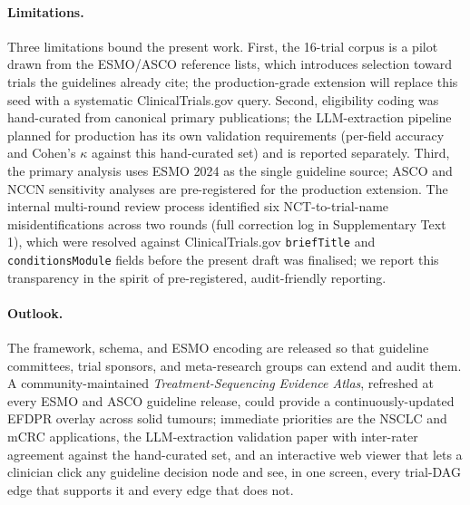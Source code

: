 \paragraph{Limitations.}
Three limitations bound the present work. First, the 16-trial corpus is a pilot drawn from the ESMO/ASCO reference lists, which introduces selection toward trials the guidelines already cite; the production-grade extension will replace this seed with a systematic ClinicalTrials.gov query. Second, eligibility coding was hand-curated from canonical primary publications; the LLM-extraction pipeline planned for production has its own validation requirements (per-field accuracy and Cohen's $\kappa$ against this hand-curated set) and is reported separately. Third, the primary analysis uses ESMO 2024 as the single guideline source; ASCO and NCCN sensitivity analyses are pre-registered for the production extension. The internal multi-round review process identified six NCT-to-trial-name misidentifications across two rounds (full correction log in Supplementary Text 1), which were resolved against ClinicalTrials.gov \texttt{briefTitle} and \texttt{conditionsModule} fields before the present draft was finalised; we report this transparency in the spirit of pre-registered, audit-friendly reporting.

\paragraph{Outlook.}
The framework, schema, and ESMO encoding are released so that guideline committees, trial sponsors, and meta-research groups can extend and audit them. A community-maintained \emph{Treatment-Sequencing Evidence Atlas}, refreshed at every ESMO and ASCO guideline release, could provide a continuously-updated EFDPR overlay across solid tumours; immediate priorities are the NSCLC and mCRC applications, the LLM-extraction validation paper with inter-rater agreement against the hand-curated set, and an interactive web viewer that lets a clinician click any guideline decision node and see, in one screen, every trial-DAG edge that supports it and every edge that does not.

